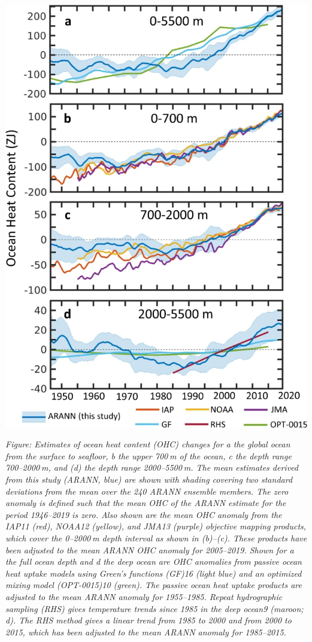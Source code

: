 \documentclass[
]{book}
\begin{document}
\includegraphics{fig/deep_ocean_cooling.png}

\emph{Figure: Estimates of ocean heat content (OHC) changes for a the global ocean from the surface to seafloor, b the upper 700 m of the ocean, c the depth range 700--2000 m, and (d) the depth range 2000--5500 m. The mean estimates derived from this study (ARANN, blue) are shown with shading covering two standard deviations from the mean over the 240 ARANN ensemble members. The zero anomaly is defined such that the mean OHC of the ARANN estimate for the period 1946--2019 is zero. Also shown are the mean OHC anomaly from the IAP11 (red), NOAA12 (yellow), and JMA13 (purple) objective mapping products, which cover the 0--2000 m depth interval as shown in (b)--(c). These products have been adjusted to the mean ARANN OHC anomaly for 2005--2019. Shown for a the full ocean depth and d the deep ocean are OHC anomalies from passive ocean heat uptake models using Green's functions (GF)16 (light blue) and an optimized mixing model (OPT-0015)10 (green). The passive ocean heat uptake products are adjusted to the mean ARANN anomaly for 1955--1985. Repeat hydrographic sampling (RHS) gives temperature trends since 1985 in the deep ocean9 (maroon; d). The RHS method gives a linear trend from 1985 to 2000 and from 2000 to 2015, which has been adjusted to the mean ARANN anomaly for 1985--2015.}
\end{document}
